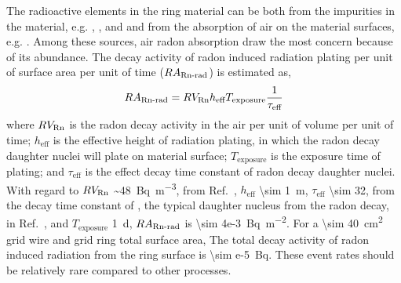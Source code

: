 The radioactive elements in the ring material can be both from the impurities in the material, e.g. , , and  and from the absorption of air on the material surfaces, e.g. . Among these sources, air radon absorption draw the most concern because of its abundance. The decay activity of radon induced radiation plating per unit of surface area per unit of time ($RA_{\text{\ce{Rn}-rad}}$) is estimated as, 
\begin{align}
	RA_{\text{\ce{Rn}-rad}} = RV_{\text{\ce{Rn}}} h_{\text{eff}} T_{\text{exposure}} \frac{1}{\tau_{\text{eff}}}
\end{align}
where $RV_{\text{\ce{Rn}}}$ is the radon decay activity in the air per unit of volume per unit of time; $h_{\text{eff}}$ is the effective height of radiation plating, in which the radon decay daughter nuclei will plate on material surface; $T_{\text{exposure}}$ is the exposure time of plating; and $\tau_{\text{eff}}$ is the effect decay time constant of radon decay daughter nuclei.
With regard to $RV_{\text{\ce{Rn}}}$ \SI{~48}{\becquerel\per\meter\cubed}, from Ref.~\cite{USEnvironmentalProtectionAgency2017}, $h_{\text{eff}}$ \SI{\sim 1}{\meter},  $\tau_{\text{eff}}$ \SI{\sim 32}{\yr}, from the decay time constant of , the typical daughter nucleus from the radon decay, in Ref.~\cite{Dulieu2008}, and $T_{\text{exposure}}$ \SI{1}{\day}, $RA_{\text{\ce{Rn}-rad}}$ is \SI{\sim 4e-3}{\becquerel\per\meter\squared}. For a \SI{\sim 40}{\cm\squared} grid wire and grid ring total surface area, The total decay activity of radon induced radiation from the ring surface is \SI{\sim e-5}{\becquerel}. These event rates should be relatively rare compared to other processes. %
